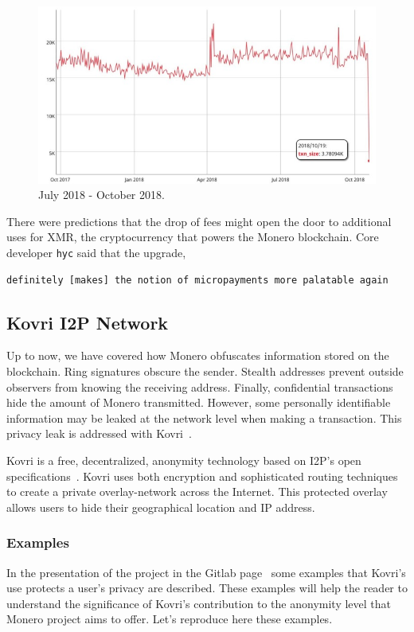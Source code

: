 \begin{figure}[H]
  \centering
  \includegraphics[width=0.8 \columnwidth,keepaspectratio]{Images/Monero/bulletproofs_1.jpg}
  \caption{July 2018 - October 2018.~\cite{bitinfocharts}}
  \label{fig:bulletproof_1}
\end{figure}
\pagebreak

There were predictions that the drop of fees might open the door to additional uses for XMR, the cryptocurrency that powers the Monero blockchain. Core developer \verb|hyc| said that the upgrade,
\begin{verbatim}
definitely [makes] the notion of micropayments more palatable again
\end{verbatim}

\subsection{Kovri I2P Network} \label{sec:Kovri}
Up to now, we have covered how Monero obfuscates information stored on the blockchain. Ring signatures obscure the sender. Stealth addresses prevent outside observers from knowing the receiving address. Finally, confidential transactions hide the amount of Monero transmitted. However, some personally identifiable information may be leaked at the network level when making a transaction. This privacy leak is addressed with Kovri~\cite{kovri}.

Kovri is a free, decentralized, anonymity technology based on I2P's open specifications~\cite{i2p}. Kovri uses both encryption and sophisticated routing techniques to create a private overlay-network across the Internet. This protected overlay allows users to hide their geographical location and IP address.

\subsubsection{Examples}
In the presentation of the project in the Gitlab page~\cite{git_kovri} some examples that Kovri's use protects a user's privacy are described. These examples will help the reader to understand the significance of Kovri's contribution to the anonymity level that Monero project aims to offer. Let's reproduce here these examples.

